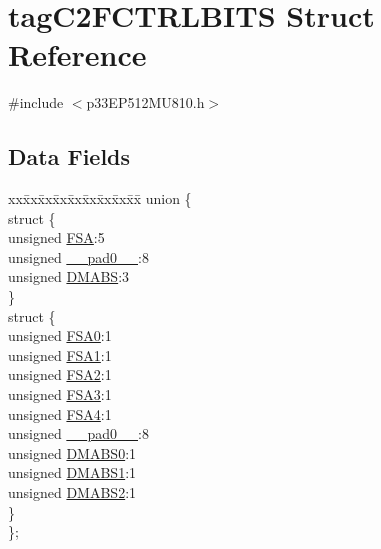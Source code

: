 \hypertarget{structtag_c2_f_c_t_r_l_b_i_t_s}{}\section{tag\+C2\+F\+C\+T\+R\+L\+B\+I\+TS Struct Reference}
\label{structtag_c2_f_c_t_r_l_b_i_t_s}


{\ttfamily \#include $<$p33\+E\+P512\+M\+U810.\+h$>$}

\subsection*{Data Fields}
\begin{DoxyCompactItemize}
\item 
\begin{tabbing}
xx\=xx\=xx\=xx\=xx\=xx\=xx\=xx\=xx\=\kill
union \{\\
\>struct \{\\
\>\>unsigned \hyperlink{structtag_c2_f_c_t_r_l_b_i_t_s_a72e40b76a8df9aef0d3c8304535459a1}{FSA}:5\\
\>\>unsigned \hyperlink{structtag_c2_f_c_t_r_l_b_i_t_s_adf71f3d8410c1f1dbbc96680a92c49af}{\_\_pad0\_\_}:8\\
\>\>unsigned \hyperlink{structtag_c2_f_c_t_r_l_b_i_t_s_a84bc9973170d3648e5138d28fd72705d}{DMABS}:3\\
\>\} \\
\>struct \{\\
\>\>unsigned \hyperlink{structtag_c2_f_c_t_r_l_b_i_t_s_a91943c32ee29d583918a84d9155905d9}{FSA0}:1\\
\>\>unsigned \hyperlink{structtag_c2_f_c_t_r_l_b_i_t_s_a8fe98dd36a42a4681bed7605e267e33e}{FSA1}:1\\
\>\>unsigned \hyperlink{structtag_c2_f_c_t_r_l_b_i_t_s_a468f0e6c061912b0a7bd0f119efcfe61}{FSA2}:1\\
\>\>unsigned \hyperlink{structtag_c2_f_c_t_r_l_b_i_t_s_a20bcf2bebd5be6be1a31fce2812487f1}{FSA3}:1\\
\>\>unsigned \hyperlink{structtag_c2_f_c_t_r_l_b_i_t_s_a612519942ed2303c487fcdfcac0d4efc}{FSA4}:1\\
\>\>unsigned \hyperlink{structtag_c2_f_c_t_r_l_b_i_t_s_adf71f3d8410c1f1dbbc96680a92c49af}{\_\_pad0\_\_}:8\\
\>\>unsigned \hyperlink{structtag_c2_f_c_t_r_l_b_i_t_s_ab21ae68b75b4bf453573c7ab016079a4}{DMABS0}:1\\
\>\>unsigned \hyperlink{structtag_c2_f_c_t_r_l_b_i_t_s_ada40d2f2558198bcf16c506a45c67c42}{DMABS1}:1\\
\>\>unsigned \hyperlink{structtag_c2_f_c_t_r_l_b_i_t_s_a2c0a5870b57109dd60672fe226fa87f0}{DMABS2}:1\\
\>\} \\
\}; \\

\end{tabbing}\end{DoxyCompactItemize}


